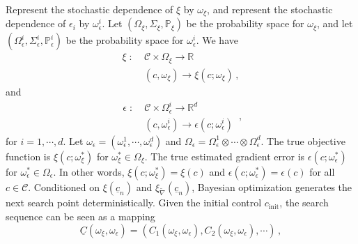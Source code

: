 Represent the stochastic dependence of $\xi$ by $\omega_\xi$, and represent 
the stochastic dependence of $\epsilon_i$ by $\omega_\epsilon^i$.
Let $(\Omega_\xi, \Sigma_\xi, \mathbb{P}_\xi)$ be the probability space for $\omega_\xi$, and let
 $(\Omega_\epsilon^i, \Sigma_\epsilon^i, \mathbb{P}_\epsilon^i)$ be the probability space for $\omega_\epsilon^i$.
We have
\begin{equation}\begin{split}
    \xi\; : \; & \mathcal{C} \times \Omega_\xi \rightarrow \mathbb{R}\\
               & (c, \omega_\xi) \rightarrow \xi(c; \omega_\xi)\,,
\end{split}\end{equation}
and
\begin{equation}\left.\begin{split}
    \epsilon \; :\; & \mathcal{C} \times \Omega_\epsilon^i \rightarrow \mathbb{R}^d \\
                    & (c, \omega_\epsilon^i) \rightarrow \epsilon(c; \omega_\epsilon^i)
\end{split}\right.\,,
\end{equation}
for $i=1,\cdots, d$.
Let $\omega_\epsilon=(\omega_\epsilon^1,\cdots, \omega_\epsilon^d)$ and $\Omega_\epsilon =\Omega_\epsilon^1\otimes \cdots
\otimes \Omega_\epsilon^d$.
The true objective function is $\xi(c; \omega_\xi^*)$ for $\omega_\xi^*\in \Omega_\xi$. 
The true estimated gradient error is $\epsilon(c;\omega_\epsilon^*)$ for $\omega_\epsilon^* \in \Omega_\epsilon$.
In other words, $\xi(c;\omega_\xi^*) = \xi(c)$ and $\epsilon(c;\omega_\epsilon^*)=\epsilon(c)$ for all
$c\in \mathcal{C}$.
Conditioned on $\xi(\underline{c}_n)$ and $\xi_{\tilde{\nabla}}(\underline{c}_n)$, 
Bayesian optimization generates the next search point deterministically.
Given the initial control $c_{\textrm{init}}$, the search sequence can be seen as a mapping
\begin{equation}
     \underline{C}(\omega_\xi, \omega_\epsilon) = \left(C_1(\omega_\xi, \omega_\epsilon),
     C_2(\omega_\xi, \omega_\epsilon), \cdots\right)\,,
\end{equation}
